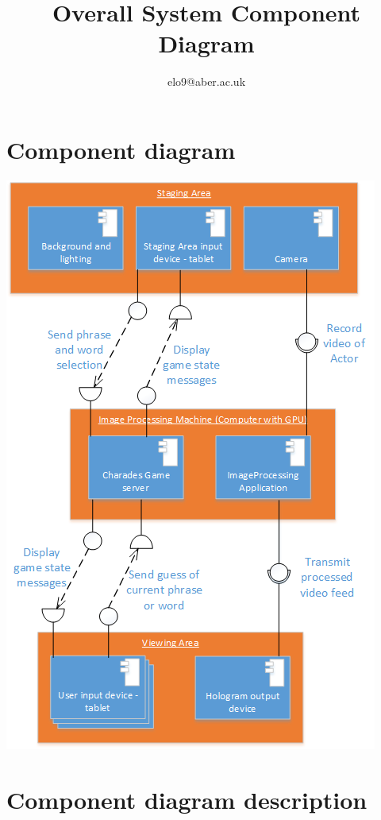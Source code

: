 \documentclass{article}
\title{Overall System Component Diagram}
\author{elo9@aber.ac.uk}
\begin{document}
\maketitle
\tableofcontents

\newpage

\section{Component diagram}
\includegraphics[width=\textwidth]{ComponentDiagramImage}

\newpage


\section{Component diagram description}
\end{document}
